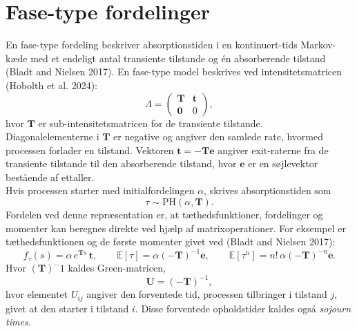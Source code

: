 \documentclass[
  10pt,
  a4paper,
]{scrbook}
\let\oldemph\emph
\renewcommand\emph[1]{\oldemph{\color{gray}#1}}
\begin{document}
\section{Fase-type fordelinger}\label{fase-type-fordelinger}

En fase-type fordeling beskriver absorptionstiden i en kontinuert-tids
Markov-kæde med et endeligt antal transiente tilstande og én
absorberende tilstand (Bladt and Nielsen 2017). En fase-type model
beskrives ved intensitetsmatricen (Hobolth et al. 2024): \[
\Lambda = \begin{pmatrix} \mathbf{T} & \mathbf{t} \\ \mathbf{0} & 0 \end{pmatrix},
\] hvor \(\mathbf{T}\) er sub-intensitetsmatricen for de transiente
tilstande. Diagonalelementerne i \(\mathbf{T}\) er negative og angiver
den samlede rate, hvormed processen forlader en tilstand. Vektoren
\(\mathbf{t} = -\mathbf{T}\mathbf{e}\) angiver exit-raterne fra de
transiente tilstande til den absorberende tilstand, hvor \(\mathbf{e}\)
er en søjlevektor bestående af ettaller.\\
Hvis processen starter med initialfordelingen \(\alpha\), skrives
absorptionstiden som \[
\tau \sim \mathrm{PH}(\alpha, \mathbf{T}).
\] Fordelen ved denne repræsentation er, at tæthedsfunktioner,
fordelinger og momenter kan beregnes direkte ved hjælp af
matrixoperationer. For eksempel er tæthedsfunktionen og de første
momenter givet ved (Bladt and Nielsen 2017): \[
f_\tau(s) = \alpha \, e^{\mathbf{T}s} \, \mathbf{t}, \qquad
\mathbb{E}[\tau] = \alpha(-\mathbf{T})^{-1}\mathbf{e}, \qquad
\mathbb{E}[\tau^n] = n!\,\alpha(-\mathbf{T})^{-n}\mathbf{e}.
\] Hvor \((\mathbf{T})^-1\) kaldes Green-matricen, \[
\mathbf{U} = (-\mathbf{T})^{-1},
\] hvor elementet \(U_{ij}\) angiver den forventede tid, processen
tilbringer i tilstand \(j\), givet at den starter i tilstand \(i\).
Disse forventede opholdstider kaldes også \emph{sojourn times}.
\end{document}

